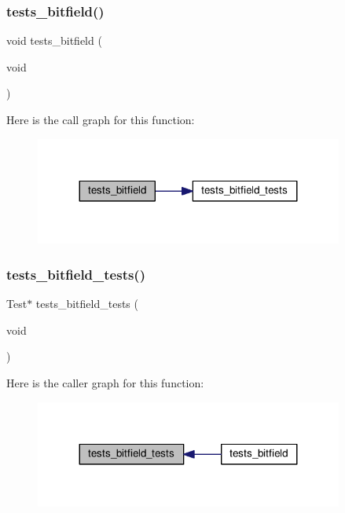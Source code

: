 \subsubsection{\texorpdfstring{tests\+\_\+bitfield()}{tests\_bitfield()}}
{\footnotesize\ttfamily void tests\+\_\+bitfield (\begin{DoxyParamCaption}\item[{void}]{ }\end{DoxyParamCaption})}

Here is the call graph for this function\+:
\nopagebreak
\begin{figure}[H]
\begin{center}
\leavevmode
\includegraphics[width=287pt]{tests-bitfield_8c_a6711f20f2fab4829ace17f5af4448ca3_cgraph}
\end{center}
\end{figure}
\mbox{\label{tests-bitfield_8c_af7a63bf115b3e6b73da561edfe0a0fb3}} 
\subsubsection{\texorpdfstring{tests\+\_\+bitfield\+\_\+tests()}{tests\_bitfield\_tests()}}
{\footnotesize\ttfamily Test$\ast$ tests\+\_\+bitfield\+\_\+tests (\begin{DoxyParamCaption}\item[{void}]{ }\end{DoxyParamCaption})}

Here is the caller graph for this function\+:
\nopagebreak
\begin{figure}[H]
\begin{center}
\leavevmode
\includegraphics[width=287pt]{tests-bitfield_8c_af7a63bf115b3e6b73da561edfe0a0fb3_icgraph}
\end{center}
\end{figure}
